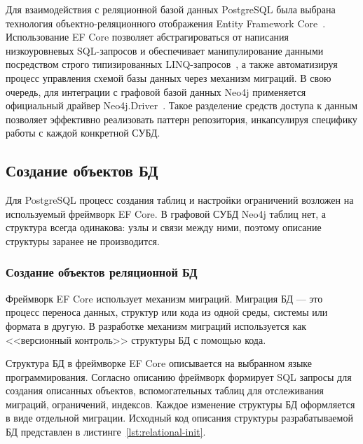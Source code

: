 Для взаимодействия с реляционной базой данных PostgreSQL была выбрана технология 
объектно-реляционного отображения Entity Framework Core~\cite{ref:efcore}. Использование 
EF Core позволяет абстрагироваться от написания низкоуровневых SQL-запросов 
и обеспечивает манипулирование данными посредством строго типизированных 
LINQ-запросов~\cite{ref:linq}, 
а также автоматизируя процесс управления схемой базы данных через механизм миграций. 
В свою очередь, для интеграции с графовой базой данных Neo4j применяется официальный 
драйвер Neo4j.Driver~\cite{ref:neo4j-driver}. Такое разделение средств доступа к 
данным позволяет эффективно реализовать паттерн репозитория, инкапсулируя специфику 
работы с каждой конкретной СУБД.

\subsection{Создание объектов БД}
Для PostgreSQL процесс создания таблиц и настройки ограничений возложен
на используемый фреймворк EF Core. В графовой СУБД Neo4j таблиц нет,
а структура всегда одинакова: узлы и связи между ними, поэтому описание структуры
заранее не производится.

\subsubsection{Создание объектов реляционной БД}
Фреймворк EF Core использует механизм миграций. Миграция БД --- это процесс 
переноса данных, структур или кода из одной среды, системы или формата в другую. 
В разработке механизм миграций используется как <<версионный контроль>> структуры 
БД с помощью кода.

Структура БД в фреймворке EF Core описывается на выбранном языке программирования.
Согласно описанию фреймворк формирует SQL запросы для создания описанных объектов, 
вспомогательных таблиц для отслеживания миграций, ограничений, индексов.
Каждое изменение структуры БД оформляется в виде отдельной миграции. Исходный код
описания структуры разрабатываемой БД представлен в листинге~\ref{lst:relational-init}.

